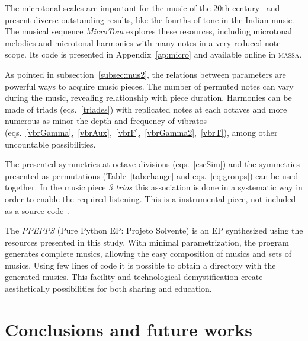 \documentclass[
 aip,
 jmp,
 amsmath,amssymb,
 reprint,
]{revtex4-1}
\newcommand{\massa}{{\large \textsc{massa}}}
\begin{document}
The microtonal scales are important for the music of the 20th
century~\cite{microtonalidade} and present diverse outstanding results, like the
fourths of tone in the Indian music. The musical sequence \emph{MicroTom}
explores these resources, including microtonal melodies and microtonal harmonies
with many notes in a very reduced note scope. Its code is presented in
Appendix~\ref{ap:micro} and available online in \massa.

As pointed in subsection~\ref{subsec:mus2}, the relations between
parameters are powerful ways to acquire music pieces. The number of permuted
notes can vary during the music, revealing relationship with piece
duration. Harmonies can be made of triads (eqs.~\ref{triades}) with replicated
notes at each octaves and more numerous as minor the depth and frequency of
vibratos (eqs.~\ref{vbrGamma},~\ref{vbrAux},~\ref{vbrF},~\ref{vbrGamma2},~\ref{vbrT}),
among other uncountable possibilities.

The presented symmetries at octave divisions (eqs.~\ref{escSim}) and the
symmetries presented as permutations (Table~\ref{tab:change} and
eqs.~\ref{eq:groups}) can be used together. In the music piece \emph{3 trios}
this association is done in a systematic way in order to enable the required
listening. This is a instrumental piece, not included as a source
code~\cite{3Trios}. 

The \emph{PPEPPS} (Pure Python EP: Projeto Solvente) is an EP synthesized using
the resources presented in this study. With minimal parametrization, the program
generates complete musics, allowing the easy composition of musics and sets of
musics. Using few lines of code it is possible to obtain
a directory with the generated musics. This facility and technological
demystification create aesthetically possibilities for both sharing and education.




\section{Conclusions and future works} %
\label{cap:conclusao}
\end{document}
